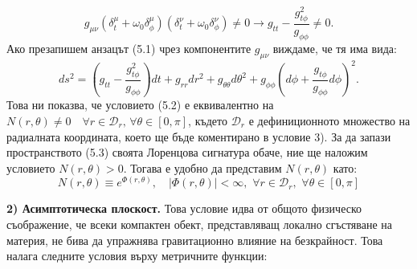 \begin{equation}
g_{\mu\nu} (\delta_t^\mu + \omega_0\delta^\mu_\phi) (\delta_t^\nu + \omega_0\delta^\nu_\phi) \ne 0 \rightarrow g_{tt} - \frac{g_{t\phi}^2}{g_{\phi\phi}} \ne 0.
\end{equation}\newline
Ако презапишем анзацът (5.1) чрез компонентите $g_{\mu\nu}$ виждаме, че тя има вида:
\begin{equation}
	ds^2 = \left(g_{tt} - \frac{g_{t\phi}^2}{g_{\phi\phi}}\right)dt + g_{rr}dr^2 + g_{\theta\theta}d\theta^2 + g_{\phi\phi}\left(d\phi + \frac{g_{t\phi}}{g_{\phi\phi}}d\phi\right)^2.
\end{equation}
Това ни показва, че условието (5.2) е еквивалентно на $N(r,\theta)\ne 0\quad \forall r\in\mathcal{D}_r,\,\forall \theta\in[0,\pi]$, където $\mathcal{D}_r$ е дефиниционното множество на радиалната координата, което ще бъде коментирано в условие 3). За да запази пространството (5.3) своята Лоренцова сигнатура обаче, ние ще наложим условието $N(r,\theta) > 0$. Тогава е удобно да представим $N(r,\theta)$ като:
\begin{equation}
	N(r,\theta) \equiv e^{\Phi(r,\theta)}, \quad |\Phi(r,\theta)| < \infty,\,\, \forall r\in\mathcal{D}_r,\,\,\forall\theta\in[0,\pi]
\end{equation}


\newpage
\textbf{2) Асимптотическа плоскост.} Това условие идва от общото физическо съображение, че всеки компактен обект, представляващ локално сгъстяване на материя, не бива да упражнява гравитационно влияние на безкрайност. Това налага следните условия върху метричните функции:

